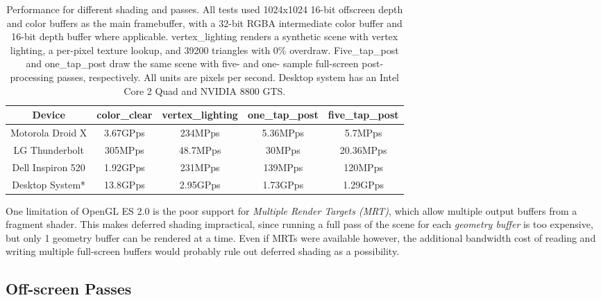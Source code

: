 \begin{table}[htb]\centering \begin{tabular}{|c||c|c|c|c|} 
\hline \small{Device} & \small{color\_clear} & \small{vertex\_lighting} & \small{one\_tap\_post} & \small{five\_tap\_post}  \\ \hline 
\hline \small{Motorola Droid X} & \small{3.67GPps} & \small{234MPps}& \small{5.36MPps\footnotemark[1]} & \small{5.7MPps\footnotemark[1]} \\ 
\hline \small{LG Thunderbolt} & \small{305MPps} & \small{48.7MPps}& \small{30MPps} & \small{20.36MPps} \\ 
\hline \small{Dell Inspiron 520} & \small{1.92GPps} & \small{231MPps}& \small{139MPps} & \small{120MPps} \\ 
\hline \small{Desktop System*} & \small{13.8GPps} & \small{2.95GPps}& \small{1.73GPps} & \small{1.29GPps} \\ 
\hline
\end{tabular} 
\caption{Performance for different shading and passes.  All tests used 1024x1024 16-bit offscreen depth and color buffers as the main framebuffer, with a 32-bit RGBA intermediate color buffer and 16-bit depth buffer where applicable.  vertex\_lighting renders a synthetic scene with vertex lighting, a per-pixel texture lookup, and 39200 triangles with 0\% overdraw.  Five\_tap\_post and one\_tap\_post draw the same scene with five- and one- sample full-screen post-processing passes, respectively.  All units are pixels per second.  Desktop system has an Intel Core 2 Quad and NVIDIA 8800 GTS.}
\label{JonMcCaffrey:pass_performance} \end{table}


One limitation of OpenGL ES 2.0 is the poor support for \textit{Multiple Render
Targets (MRT)}, which allow multiple output buffers from a fragment shader.
This makes deferred shading impractical, since running a full pass of the
scene for each \textit{geometry buffer} is too expensive, but only 1 geometry
buffer can be rendered at a time.  Even if MRTs were available however, the
additional bandwidth cost of reading and writing multiple full-screen buffers
would probably rule out deferred shading as a possibility.

\subsection{Off-screen Passes}
\label{Jon-McCaffrey-Off-Screen-Pass}

